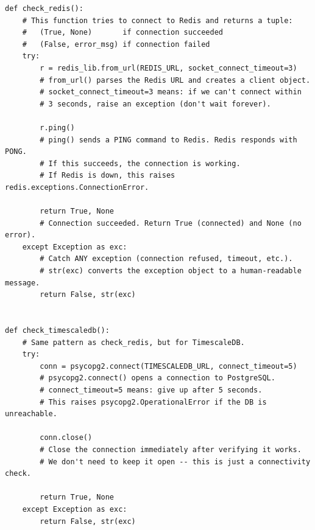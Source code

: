 \documentclass[12pt, a4paper]{article}
\begin{document}
\begin{lstlisting}[style=python, caption={services/anomaly-detector/app.py --- connection check functions}]
def check_redis():
    # This function tries to connect to Redis and returns a tuple:
    #   (True, None)       if connection succeeded
    #   (False, error_msg) if connection failed
    try:
        r = redis_lib.from_url(REDIS_URL, socket_connect_timeout=3)
        # from_url() parses the Redis URL and creates a client object.
        # socket_connect_timeout=3 means: if we can't connect within
        # 3 seconds, raise an exception (don't wait forever).

        r.ping()
        # ping() sends a PING command to Redis. Redis responds with PONG.
        # If this succeeds, the connection is working.
        # If Redis is down, this raises redis.exceptions.ConnectionError.

        return True, None
        # Connection succeeded. Return True (connected) and None (no error).
    except Exception as exc:
        # Catch ANY exception (connection refused, timeout, etc.).
        # str(exc) converts the exception object to a human-readable message.
        return False, str(exc)


def check_timescaledb():
    # Same pattern as check_redis, but for TimescaleDB.
    try:
        conn = psycopg2.connect(TIMESCALEDB_URL, connect_timeout=5)
        # psycopg2.connect() opens a connection to PostgreSQL.
        # connect_timeout=5 means: give up after 5 seconds.
        # This raises psycopg2.OperationalError if the DB is unreachable.

        conn.close()
        # Close the connection immediately after verifying it works.
        # We don't need to keep it open -- this is just a connectivity check.

        return True, None
    except Exception as exc:
        return False, str(exc)
\end{lstlisting}
\end{document}
